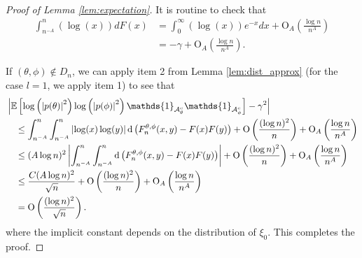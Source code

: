 \documentclass[12pt]{amsart}
\theoremstyle{plain}
\numberwithin{equation}{section}
\newcommand{\<}{\langle}
\renewcommand{\>}{\rangle}
\newcommand{\PP}[1]{\left(#1\right)}
\newcommand{\dd}{\textnormal{d}}
\newcommand{\E}[2][ ]{\mathbb{E}{#1}\left[#2\right]}
\newcommand{\abs}[1]{\left|#1\right|}
\begin{document}
\begin{proof}[Proof of Lemma \ref{lem:expectation}]
It is routine to check that 
\begin{align*}
\int_{n^{-A}}^n (\log(x)) dF(x) & = \int_{0}^{\infty} (\log(x))e^{-x} dx +  \mbox{O}_A\PP{\frac{\log n}{n^{A}}} \\
& = -\gamma +  \mbox{O}_A\PP{\frac{\log n}{n^{A}}}.
\end{align*}

If $(\theta,\phi)\not\in D_n$, we can apply item 2 from Lemma \ref{lem:dist_approx} (for the case $l=1$, we apply item 1) to see that
\begin{align*}
& \abs{ \E{\log \PP{\abs{p(\theta)}^2} \log\PP{\abs{p(\phi)}^2} \mathds{1}_{\mathcal{A}_{\theta}^c} \mathds{1}_{\mathcal{A}_{\phi}^c}} - \gamma^2} \\
& \quad \leq \int_{n^{-A}}^n \int_{n^{-A}}^n \abs{\log(x)\log(y)} \dd\PP{F_n^{\theta,\phi}(x,y)-F(x)F(y)} + \mbox{O}\PP{\frac{(\log n)^2}{n}} + \mbox{O}_A\PP{\frac{\log n}{n^{A}}} \\
& \quad \leq (A\log n)^2 \abs{\int_{n^{-A}}^n \int_{n^{-A}}^n \dd\PP{F_n^{\theta,\phi}(x,y)-F(x)F(y)}} + \mbox{O}\PP{\frac{(\log n)^2}{n}} + \mbox{O}_A\PP{\frac{\log n}{n^{A}}} \\
& \quad \leq \frac{C (A\log n)^2}{\sqrt{n}} + \mbox{O}\PP{\frac{(\log n)^2}{n}} + \mbox{O}_A\PP{\frac{\log n}{n^{A}}} \\
&\quad =\mbox{O}\PP{\frac{(\log n)^2 }{\sqrt{n}}}.
\end{align*}
where the implicit constant depends on the distribution of $\xi_0$. This completes the proof.
\end{proof}
\end{document}
